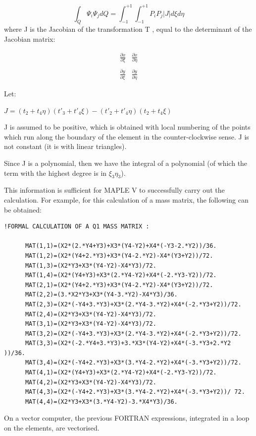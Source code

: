 \[\int _{Q}\Psi _{i}  \Psi _{j} dQ=\int _{-1}^{+1}\int _{-1}^{+1}P_{i} P_{j} \left|J\right|d\xi d\eta   \]
where J is the Jacobian of the transformation T , equal to the determinant of the Jacobian matrix:

\[
\begin{array}{cc}
  \frac{\partial{x}}{\partial{\xi}} & \frac{\partial{x}}{\partial{\eta}} \\
  \\
  \frac{\partial{y}}{\partial{\xi}} & \frac{\partial{y}}{\partial{\eta}}
\end{array}
\]

Let:

$J = (t_{2}+t_{4}\eta) (t'_{3}+t'_{4}\xi) - (t'_{2}+t'_{4}\eta) (t_{2}+t_{4}\xi)$

J is assumed to be positive, which is obtained with local numbering of the
points which run along the boundary of the element in the counter-clockwise
sense. J is not constant (it is with linear triangles).

Since J is a polynomial, then we have the integral of a polynomial (of which
the term with the highest degree is in $\xi _{3}\eta _{3}$).

This information is sufficient for MAPLE V to successfully carry out the
calculation. For example, for this calculation of a mass matrix, the following
can be obtained:
\begin{lstlisting}[language=TelFortran]
!FORMAL CALCULATION OF A Q1 MASS MATRIX :

      MAT(1,1)=(X2*(2.*Y4+Y3)+X3*(Y4-Y2)+X4*(-Y3-2.*Y2))/36.
      MAT(1,2)=(X2*(Y4+2.*Y3)+X3*(Y4-2.*Y2)-X4*(Y3+Y2))/72.
      MAT(1,3)=(X2*Y3+X3*(Y4-Y2)-X4*Y3)/72.
      MAT(1,4)=(X2*(Y4+Y3)+X3*(2.*Y4-Y2)+X4*(-2.*Y3-Y2))/72.
      MAT(2,1)=(X2*(Y4+2.*Y3)+X3*(Y4-2.*Y2)-X4*(Y3+Y2))/72.
      MAT(2,2)=(3.*X2*Y3+X3*(Y4-3.*Y2)-X4*Y3)/36.
      MAT(2,3)=(X2*(-Y4+3.*Y3)+X3*(2.*Y4-3.*Y2)+X4*(-2.*Y3+Y2))/72.
      MAT(2,4)=(X2*Y3+X3*(Y4-Y2)-X4*Y3)/72.
      MAT(3,1)=(X2*Y3+X3*(Y4-Y2)-X4*Y3)/72.
      MAT(3,2)=(X2*(-Y4+3.*Y3)+X3*(2.*Y4-3.*Y2)+X4*(-2.*Y3+Y2))/72.
      MAT(3,3)=(X2*(-2.*Y4+3.*Y3)+3.*X3*(Y4-Y2)+X4*(-3.*Y3+2.*Y2 ))/36.
      MAT(3,4)=(X2*(-Y4+2.*Y3)+X3*(3.*Y4-2.*Y2)+X4*(-3.*Y3+Y2))/72.
      MAT(4,1)=(X2*(Y4+Y3)+X3*(2.*Y4-Y2)+X4*(-2.*Y3-Y2))/72.
      MAT(4,2)=(X2*Y3+X3*(Y4-Y2)-X4*Y3)/72.
      MAT(4,3)=(X2*(-Y4+2.*Y3)+X3*(3.*Y4-2.*Y2)+X4*(-3.*Y3+Y2))/ 72.
      MAT(4,4)=(X2*Y3+X3*(3.*Y4-Y2)-3.*X4*Y3)/36.
\end{lstlisting}
On a vector computer, the previous FORTRAN expressions, integrated in a loop on
the elements, are vectorised.

